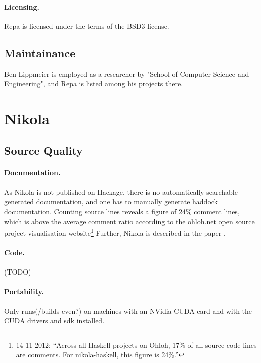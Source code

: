 
\paragraph{Licensing.} Repa is licensed under the terms of the BSD3 license.

\subsection{Maintainance}
Ben Lippmeier is employed as a researcher by "School of Computer Science and
Engineering", and Repa is listed among his projects there.

\section{Nikola}

\subsection{Source Quality}

\paragraph{Documentation.} As Nikola is not published on Hackage, there is no
automatically searchable generated documentation, and one has to manually
generate haddock documentation. Counting source lines reveals a figure of 24\%
comment lines, which is above the average comment ratio according to the
ohloh.net open source project visualisation website\footnote{14-11-2012:
``Across all Haskell projects on Ohloh, 17\% of all source code lines are
comments. For nikola-haskell, this figure is 24\%.''} Further, Nikola is
described in the paper \cite{mainland10nikola}.

\paragraph{Code.} (TODO)

\paragraph{Portability.} Only runs(/builds even?) on machines with an NVidia
CUDA card and with the CUDA drivers and sdk installed.

